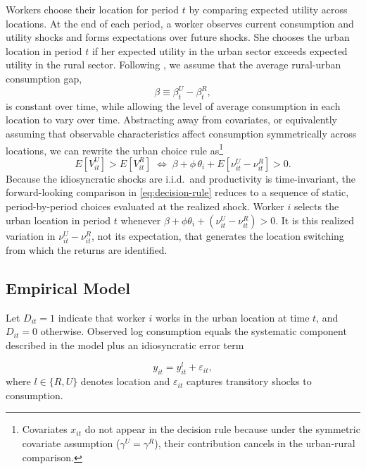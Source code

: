 \documentclass[12pt]{article}
\begin{document}
Workers choose their location for period $t$ by comparing expected utility across locations. 
At the end of each period, a worker observes current consumption and utility shocks and forms expectations over future shocks. 
She chooses the urban location in period $t$ if her expected utility in the urban sector exceeds expected utility in the rural sector. 
Following \cite{lemieuxEstimatingEffectsUnions1998}, we assume that the average rural-urban consumption gap,
\begin{equation}
    \beta \equiv \beta_t^U - \beta_t^R,\label{eq:beta}
\end{equation}
is constant over time, while allowing the level of average consumption in each location to vary over time.
Abstracting away from covariates, or equivalently assuming that observable characteristics affect consumption symmetrically across locations, we can rewrite the urban choice rule as\footnote{Covariates $x_{it}$ do not appear in the decision rule because under the symmetric covariate assumption ($\gamma^U = \gamma^R$), their contribution cancels in the urban-rural comparison.} 
\begin{equation}\label{eq:decision-rule}
    E\!\left[V_{it}^U\right] > E\!\left[V_{it}^R\right]
    \;\Longleftrightarrow\;
    \beta + \phi\,\theta_i + E\!\left[\nu_{it}^U - \nu_{it}^R\right] > 0.
\end{equation}
Because the idiosyncratic shocks are i.i.d.\ and productivity is time-invariant, the forward-looking comparison in \eqref{eq:decision-rule} reduces to a sequence of static, period-by-period choices evaluated at the realized shock.
Worker $i$ selects the urban location in period $t$ whenever $\beta + \phi\theta_i + (\nu_{it}^U - \nu_{it}^R) > 0$.
It is this realized variation in $\nu_{it}^U - \nu_{it}^R$, not its expectation, that generates the location switching from which the returns are identified.

\subsection{Empirical Model}\label{subsec:empirical-model}

Let $D_{i t}=1$ indicate that worker $i$ works in the urban location at time $t$, and $D_{i t}=0$ otherwise.
Observed log consumption equals the systematic component described in the model plus an idiosyncratic error term

\begin{equation}
    y_{i t} = y_{i t}^l + \varepsilon_{i t},
\end{equation}
where $l \in \{R,U\}$ denotes location and $\varepsilon_{i t}$ captures transitory shocks to consumption.
\end{document}
